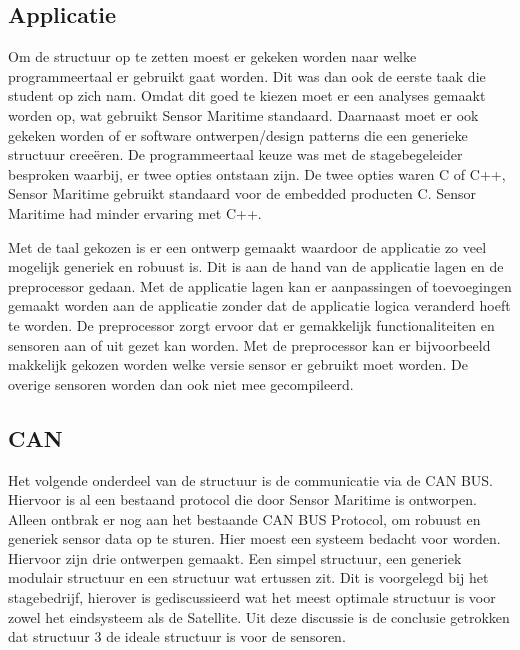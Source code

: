 \subsection{Applicatie}
Om de structuur op te zetten moest er gekeken worden naar welke programmeertaal er gebruikt gaat worden. Dit was dan ook de eerste taak die student op zich nam. Omdat dit goed te kiezen moet er een analyses gemaakt worden op, wat gebruikt Sensor Maritime standaard. Daarnaast moet er ook gekeken worden of er software ontwerpen/design patterns die een generieke structuur creeëren. De programmeertaal keuze was met de stagebegeleider besproken waarbij, er twee opties ontstaan zijn. De twee opties waren C of C++, Sensor Maritime gebruikt standaard voor de embedded producten C. Sensor Maritime had minder ervaring met C++. \newline

\noindent Met de taal gekozen is er een ontwerp gemaakt waardoor de applicatie zo veel mogelijk generiek en robuust is. Dit is aan de hand van de applicatie lagen en de preprocessor gedaan. Met de applicatie lagen kan er aanpassingen of toevoegingen gemaakt worden aan de applicatie zonder dat de applicatie logica veranderd hoeft te worden. De preprocessor zorgt ervoor dat er gemakkelijk functionaliteiten en sensoren aan of uit gezet kan worden. Met de preprocessor kan er bijvoorbeeld makkelijk gekozen worden welke versie sensor er gebruikt moet worden. De overige sensoren worden dan ook niet mee gecompileerd.

\subsection{CAN}
Het volgende onderdeel van de structuur is de communicatie via de CAN BUS. Hiervoor is al een bestaand protocol die door Sensor Maritime is ontworpen. Alleen ontbrak er nog aan het bestaande CAN BUS Protocol, om robuust en generiek sensor data op te sturen. Hier moest een systeem bedacht voor worden. Hiervoor zijn drie ontwerpen gemaakt. Een simpel structuur, een generiek modulair structuur en een structuur wat ertussen zit. Dit is voorgelegd bij het stagebedrijf, hierover is gediscussieerd wat het meest optimale structuur is voor zowel het eindsysteem als de Satellite. Uit deze discussie is de conclusie getrokken dat structuur 3 de ideale structuur is voor de sensoren.

